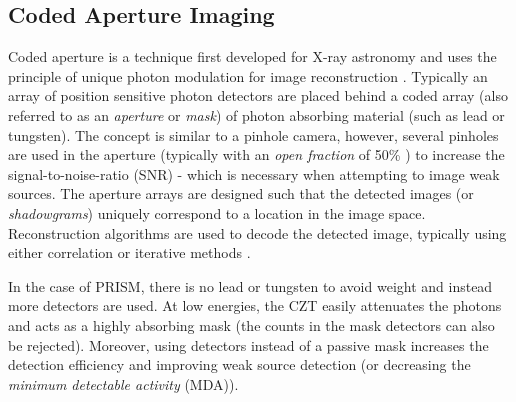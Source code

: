 \documentclass[10pt]{article}
\begin{document}

\subsection{Coded Aperture Imaging}

Coded aperture is a technique first developed for X-ray astronomy and uses the principle of unique photon modulation for image reconstruction \cite{Dicke1968}. Typically an array of position sensitive photon detectors are placed behind a coded array (also referred to as an \emph{aperture} or \emph{mask}) of photon absorbing material (such as lead or tungsten). The concept is similar to a pinhole camera, however, several pinholes are used in the aperture (typically with an \emph{open fraction} of 50\% \cite{FenimoreCannon1978}) to increase the signal-to-noise-ratio (SNR) - which is necessary when attempting to image weak sources. The aperture arrays are designed such that the detected images (or \emph{shadowgrams}) uniquely correspond to a location in the image space. Reconstruction algorithms are used to decode the detected image, typically using either correlation or iterative methods \cite{FenimoreCannon1978, LangeCarson1984}.


In the case of PRISM, there is no lead or tungsten to avoid weight and instead more detectors are used. At low energies, the CZT easily attenuates the photons and acts as a highly absorbing mask (the counts in the mask detectors can also be rejected). Moreover, using detectors instead of a passive mask increases the detection efficiency and improving weak source detection (or decreasing the \emph{minimum detectable activity} (MDA)).
\end{document}
